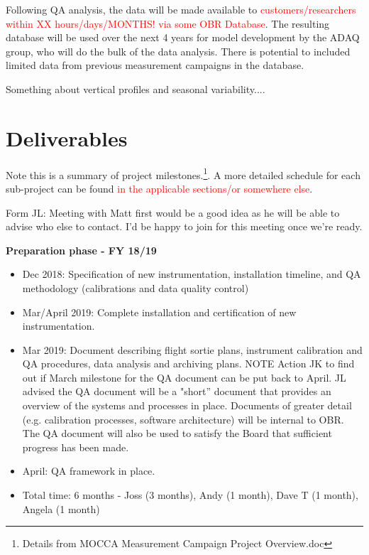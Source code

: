 \documentclass[11pt]{article} %
\begin{document}
Following QA analysis, the data will be made available to \textcolor{red}{customers/researchers within XX hours/days/MONTHS! via some OBR Database}. The resulting database will be used over the next 4 years for model development by the ADAQ group, who will do the bulk of the data analysis. There is potential to included limited data from previous measurement campaigns in the database.

Something about vertical profiles and seasonal variability....
\section{Deliverables}

Note this is a summary of project milestones.\footnote{Details from MOCCA Measurement Campaign Project Overview.doc}. A more detailed schedule for each sub-project can be found \textcolor{red}{in the applicable sections/or somewhere else}. 

Form JL: Meeting with Matt first would be a good idea as he will be able to advise who else to contact. I’d be happy to join for this meeting once we’re ready. 

\textbf{Preparation phase - FY 18/19}

\begin{itemize}
\item	Dec 2018: Specification of new instrumentation, installation timeline, and QA methodology (calibrations and data quality control)
\item 	Mar/April 2019: Complete installation and certification of new instrumentation.
\item 	Mar 2019: Document describing flight sortie plans, instrument calibration and QA procedures, data analysis and archiving plans. NOTE Action JK to find out if March milestone for the QA document can be put back to April. JL advised the QA document will be a "short” document that provides an overview of the systems and processes in place. Documents of greater detail (e.g. calibration processes, software architecture) will be internal to OBR. The QA document will also be used to satisfy the Board that sufficient progress has been made.
\item     April: QA framework in place.
\item 	Total time: 6 months - Joss (3 months), Andy (1 month), Dave T (1 month), Angela (1 month)
\end{itemize}
\end{document}
